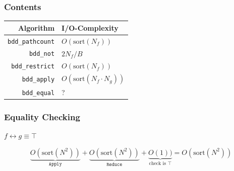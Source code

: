 \documentclass[english, aspectratio=169]{beamer}
\newcommand{\sort}[0]{\text{sort}}
\begin{document}
\begin{frame}{}
  \frametitle{Contents}
\end{frame}

\begin{frame}
  \begin{table}
    \centering
    \begin{tabular}{rl}
      Algorithm                 & I/O-Complexity
      \\ \hline \hline
      \lstinline{bdd_pathcount} & $O(\sort(N_f))$
      \\ \hline
      \lstinline{bdd_not}       & $2 N_f / B$
      \\
      \lstinline{bdd_restrict}  & $O(\sort(N_f))$
      \\
      \lstinline{bdd_apply}     & $O(\sort(N_f \cdot N_g))$
                                  \pause
      \\ \hline
      \lstinline{bdd_equal}     & ?
    \end{tabular}
  \end{table}
\end{frame}

\begin{frame}
  \frametitle{Equality Checking}

  \vspace{30pt}
  \begin{center}
    {\huge $f \leftrightarrow g \equiv \top$}
  \end{center}

  \pause
  \vspace{20pt}

  \begin{equation*}
    \underbrace{O(\sort(N^2))}_{\texttt{Apply}}
    + \underbrace{O(\sort(N^2))}_{\texttt{Reduce}}
    + \underbrace{O(1))}_{\text{check is } \top}
    = O(\sort(N^2))
  \end{equation*}
\end{frame}
\end{document}
